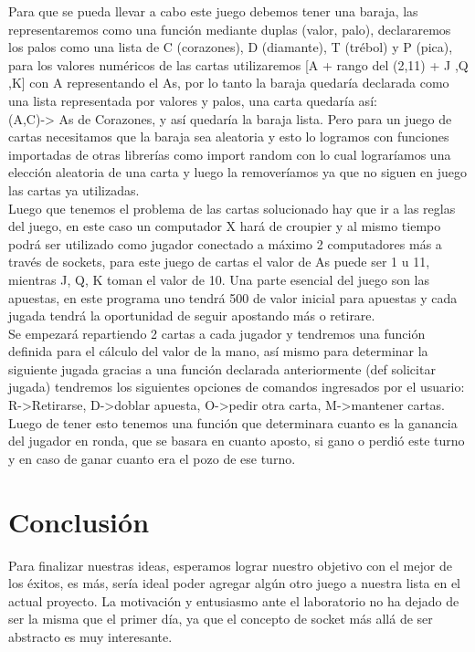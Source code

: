 \documentclass{article}
\begin{document}
Para que se pueda llevar a cabo este juego debemos tener una baraja, las representaremos como una función mediante duplas (valor, palo), declararemos los palos como una lista de C (corazones), D (diamante), T (trébol) y P (pica), para los valores numéricos de las cartas utilizaremos [A + rango del (2,11)  + J ,Q ,K] con A representando el As, por lo tanto la baraja quedaría declarada como una lista representada por valores y palos, una carta quedaría así: \\
(A,C)-> As de Corazones, y así quedaría la baraja lista.
Pero para un juego de cartas necesitamos que la baraja sea aleatoria y esto lo logramos con funciones importadas de otras librerías como import random con lo cual lograríamos una elección aleatoria de una carta y luego la removeríamos ya que no siguen en juego las cartas ya utilizadas.\\
Luego que tenemos el problema de las cartas solucionado hay que ir a las reglas del juego, en este caso un computador X hará de croupier y al mismo tiempo podrá ser utilizado como jugador conectado a máximo 2 computadores más a través de sockets, para este juego de cartas el valor de As puede ser 1 u 11, mientras J, Q, K toman el valor de 10. Una parte esencial del juego son las apuestas, en este programa uno tendrá 500 de valor inicial para apuestas y cada jugada tendrá la oportunidad de seguir apostando más o retirare.\\
Se empezará repartiendo 2 cartas a cada jugador y tendremos una función definida para el cálculo del valor de la mano, así mismo para determinar la siguiente jugada gracias a una función declarada anteriormente (def solicitar jugada) tendremos los siguientes opciones de comandos ingresados por el usuario:\\
R->Retirarse, D->doblar apuesta, O->pedir otra carta, M->mantener cartas.\\
Luego de tener esto tenemos una función que determinara cuanto es la ganancia del jugador en ronda, que se basara en cuanto aposto, si gano o perdió este turno y en caso de ganar cuanto era el pozo de ese turno.


\newpage

\section{Conclusión\vspace{0.5cm}}

Para finalizar nuestras ideas, esperamos lograr nuestro objetivo con el mejor de los éxitos, es más, sería ideal poder agregar algún otro juego a nuestra lista en el actual proyecto. La motivación y entusiasmo ante el laboratorio no ha dejado de ser la misma que el primer día, ya que el concepto de socket más allá de ser abstracto es muy interesante. 
\end{document}
